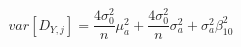 \begin{equation}
var[D_{Y,j}] = \frac{4\sigma_0^2}{n}\mu_{a}^2 + \frac{4\sigma_0^2}{n}\sigma_{a}^2 + \sigma_{a}^2\beta_{10}^2
\label{var_unobserved}
\end{equation}